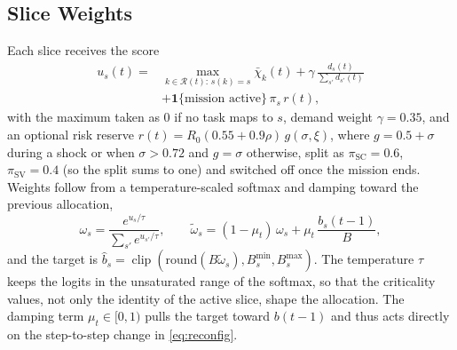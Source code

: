\documentclass[conference]{IEEEtran}
\newcommand{\ind}[1]{\mathbf{1}\{#1\}}
\DeclareMathOperator{\clip}{clip}
\begin{document}
\subsection{Slice Weights}
Each slice receives the score
\begin{equation}
\begin{aligned}
u_s(t)={}&\max_{k\in\mathcal{R}(t):\,s(k)=s}\bar\chi_k(t)+\gamma\,\frac{d_s(t)}{\sum_{s'}d_{s'}(t)}\\
&+\ind{\text{mission active}}\,\pi_s\,r(t),
\end{aligned}
\label{eq:score}
\end{equation}
with the maximum taken as 0 if no task maps to $s$, demand weight $\gamma=0.35$, and an optional risk reserve $r(t)=R_0(0.55+0.9\rho)\,g(\sigma,\xi)$, where $g=0.5+\sigma$ during a shock or when $\sigma>0.72$ and $g=\sigma$ otherwise, split as $\pi_{\mathrm{SC}}=0.6$, $\pi_{\mathrm{SV}}=0.4$ (so the split sums to one) and switched off once the mission ends. Weights follow from a temperature-scaled softmax and damping toward the previous allocation,
\begin{equation}
\omega_s=\frac{e^{u_s/\tau}}{\sum_{s'}e^{u_{s'}/\tau}},\qquad \tilde\omega_s=(1-\mu_t)\,\omega_s+\mu_t\,\frac{b_s(t-1)}{B},
\label{eq:softmax}
\end{equation}
and the target is $\hat b_s=\clip(\mathrm{round}(B\tilde\omega_s),B_s^{\min},B_s^{\max})$. The temperature $\tau$ keeps the logits in the unsaturated range of the softmax, so that the criticality values, not only the identity of the active slice, shape the allocation. The damping term $\mu_t\in[0,1)$ pulls the target toward $b(t-1)$ and thus acts directly on the step-to-step change in \eqref{eq:reconfig}.
\end{document}
